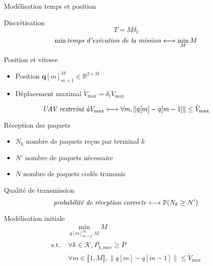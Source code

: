 \begin{frame}{Modélisation temps et position}
  \begin{block}{Discrétisation}
    \[ T = M \delta_t \]
    \begin{equation}
      \min \text{\textit{temps d'exécution de la mission}}
      \longleftrightarrow \min_M M
    \end{equation}
  \end{block}
  \begin{block}{Position et vitesse}
    \begin{itemize}
    \item Position \( \mathbf{q}[m]_{m = 1}^M \in \mathbb{R}^{2 \times
      M} \)
    \item Déplacement maximal \( \tilde{V}_{\text{max}} = \delta_t
      V_{\text{max}} \)
    \end{itemize}
    \begin{equation}
      \text{\textit{UAV restreint à}} V_{\text{max}} \longleftrightarrow
      \forall m, \| q[m] - q[m - 1] \| \leq \tilde{V}_{\text{max}}
    \end{equation}
  \end{block}
\end{frame}
\begin{frame}{Réception des paquets}
  \begin{itemize}
  \item \( N_k \) nombre de paquets reçus par terminal \( k \)
  \item \( N' \) nombre de paquets nécessaire
  \item \( N \) nombre de paquets codés transmis
  \end{itemize}
  \begin{block}{Qualité de transmission}
    \begin{equation}
      \text{\textit{probabilité de réception correcte}} \longleftrightarrow
      \mathbb{P}(N_k \geq N')
    \end{equation}
  \end{block}
\end{frame}
\begin{frame}{Modélisation initiale}
  \begin{align}
      & \min_{q[m]_{m=1}^M, M} M \tag{P1} \label{eq:init-obj} \\
      \text{s.t. } & \forall k \in \mathcal{K}, P_{k, \text{succ}}
      \geq \bar{P} \label{eq:init-prec} \\
      & \forall m \in \llbracket 1, M \rrbracket, \| q[m] - q[m - 1]
      \| \leq \tilde{V}_{\text{max}}
  \end{align}
\end{frame}

